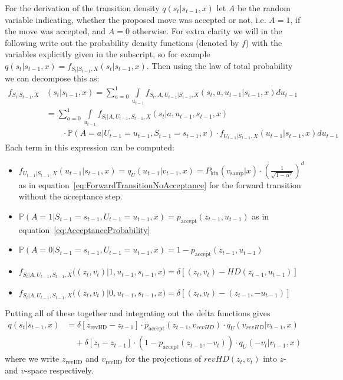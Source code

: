 \documentclass[12pt]{scrartcl}
\begin{document}
For the derivation of the transition density $q(s_t|s_{t-1}, x)$ let $A$ be the random variable indicating, whether the proposed move was accepted or not, i.e. $A=1$, if the move was accepted, and $A=0$ otherwise. For extra clarity we will in the following write out the probability density functions (denoted by $f$) with the variables explicitly given in the subscript, so for example $q(s_t|s_{t-1}, x) = f_{S_t|S_{t-1}, X}(s_t|s_{t-1}, x)$. Then using the law of total probability we can decompose this as:
\begin{equation}
\begin{split}
f_{S_t|S_{t-1}, X}&(s_t|s_{t-1}, x)= \sum_{a=0}^1 \int \limits_{u_{t-1}} f_{S_t, A, U_{t-1}|S_{t-1}, X}(s_t, a, u_{t-1}|s_{t-1}, x) du_{t-1} \\
& = \sum_{a=0}^1 \int \limits_{u_{t-1}} f_{S_t|A, U_{t-1}, S_{t-1}, X}(s_t| a, u_{t-1}, s_{t-1}, x) \\
& \qquad\cdot \mathbb{P}(A = a|U_{t-1} = u_{t-1}, S_{t-1} = s_{t-1}, x) \cdot f_{U_{t-1}|S_{t-1}, X}(u_{t-1}|s_{t-1}, x) du_{t-1}
\end{split}
\end{equation}
Each term in this expression can be computed:
\begin{itemize}
\item $f_{U_{t-1}|S_{t-1}, X}(u_{t-1}|s_{t-1}, x) = q_U(u_{t-1}|v_{t-1}, x) = P_\textrm{kin}(v_{\textrm{samp}}|x) \cdot (\frac{1}{\sqrt{1 - \alpha^2}})^{d}$ as in equation~\eqref{eq:ForwardTransitionNoAcceptance} for the forward transition without the acceptance step.
\item $\mathbb{P}(A=1|S_{t-1} = s_{t-1}, U_{t-1} = u_{t-1}, x) = p_{\textrm{accept}}(z_{t-1}, u_{t-1})$ as in equation~\eqref{eq:AcceptanceProbability}
\item $\mathbb{P}(A=0|S_{t-1} = s_{t-1}, U_{t-1} = u_{t-1}, x) = 1- p_{\textrm{accept}}(z_{t-1}, u_{t-1})$
\item $f_{S_t|A, U_{t-1}, S_{t-1}, X}\big((z_t, v_t)| 1, u_{t-1}, s_{t-1}, x\big) = \delta \left[(z_t, v_t) - HD(z_{t-1}, u_{t-1}) \right]$
\item $f_{S_t|A, U_{t-1}, S_{t-1}, X}\big((z_t, v_t)| 0, u_{t-1}, s_{t-1}, x\big) = \delta \left[(z_t, v_t) - (z_{t-1}, -u_{t-1}) \right]$
\end{itemize}

Putting all of these together and integrating out the delta functions gives
\begin{equation}
\begin{split}
q(s_t |s_{t-1}, x) &= \delta \left[z_{\textrm{revHD}} - z_{t-1} \right] \cdot p_{\textrm{accept}}(z_{t-1}, v_{revHD}) \cdot q_U(v_{revHD}|v_{t-1}, x) \\
&\quad + \delta \left[ z_t - z_{t-1} \right] \cdot (1 - p_{\textrm{accept}}(z_{t-1}, -v_t)) \cdot q_U(-v_t|v_{t-1}, x)
\end{split}
\end{equation}
where we write $z_{\textrm{revHD}}$ and $v_{\textrm{revHD}}$ for the projections of $revHD(z_t, v_t)$ into $z$- and $v$-space respectively.
\end{document}
